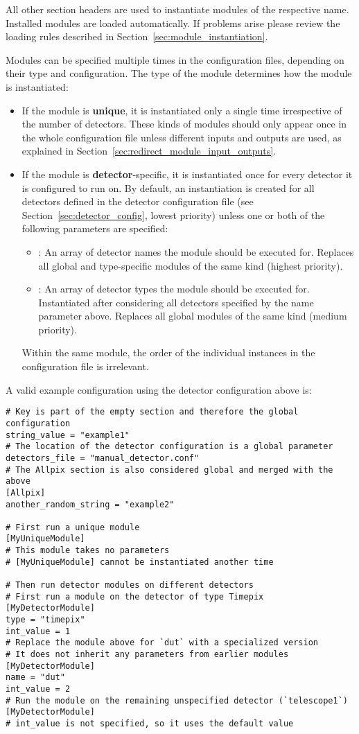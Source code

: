 All other section headers are used to instantiate modules of the respective name.
Installed modules are loaded automatically.
If problems arise please review the loading rules described in Section~\ref{sec:module_instantiation}.

Modules can be specified multiple times in the configuration files, depending on their type and configuration.
The type of the module determines how the module is instantiated:
\begin{itemize}
\item If the module is \textbf{unique}, it is instantiated only a single time irrespective of the number of detectors.
These kinds of modules should only appear once in the whole configuration file unless different inputs and outputs are used, as explained in Section~\ref{sec:redirect_module_input_outputs}.
\item If the module is \textbf{detector}-specific, it is instantiated once for every detector it is configured to run on.
By default, an instantiation is created for all detectors defined in the detector configuration file (see Section~\ref{sec:detector_config}, lowest priority) unless one or both of the following parameters are specified:
\begin{itemize}
\item {}: An array of detector names the module should be executed for.
Replaces all global and type-specific modules of the same kind (highest priority).
\item {}: An array of detector types the module should be executed for.
Instantiated after considering all detectors specified by the name parameter above.
Replaces all global modules of the same kind (medium priority).
\end{itemize}
Within the same module, the order of the individual instances in the configuration file is irrelevant.
\end{itemize}

A valid example configuration using the detector configuration above is:
\begin{verbatim}
# Key is part of the empty section and therefore the global configuration
string_value = "example1"
# The location of the detector configuration is a global parameter
detectors_file = "manual_detector.conf"
# The Allpix section is also considered global and merged with the above
[Allpix]
another_random_string = "example2"

# First run a unique module
[MyUniqueModule]
# This module takes no parameters
# [MyUniqueModule] cannot be instantiated another time

# Then run detector modules on different detectors
# First run a module on the detector of type Timepix
[MyDetectorModule]
type = "timepix"
int_value = 1
# Replace the module above for `dut` with a specialized version
# It does not inherit any parameters from earlier modules
[MyDetectorModule]
name = "dut"
int_value = 2
# Run the module on the remaining unspecified detector (`telescope1`)
[MyDetectorModule]
# int_value is not specified, so it uses the default value
\end{verbatim}

